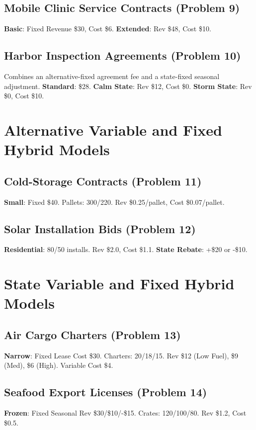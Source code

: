 	\subsection{Mobile Clinic Service Contracts (Problem 9)}
	\textbf{Basic}: Fixed Revenue \$30, Cost \$6. \textbf{Extended}: Rev \$48, Cost \$10.
	
	\subsection{Harbor Inspection Agreements (Problem 10)}
	Combines an alternative-fixed agreement fee and a state-fixed seasonal adjustment.
	\textbf{Standard}: \$28. \textbf{Calm State}: Rev \$12, Cost \$0. \textbf{Storm State}: Rev \$0, Cost \$10.
	
	\section{Alternative Variable and Fixed Hybrid Models}
	
	\subsection{Cold-Storage Contracts (Problem 11)}
	\textbf{Small}: Fixed \$40. Pallets: 300/220. Rev \$0.25/pallet, Cost \$0.07/pallet.
	
	\subsection{Solar Installation Bids (Problem 12)}
	\textbf{Residential}: 80/50 installs. Rev \$2.0, Cost \$1.1. \textbf{State Rebate}: +\$20 or -\$10.
	
	\section{State Variable and Fixed Hybrid Models}
	
	\subsection{Air Cargo Charters (Problem 13)}
	\textbf{Narrow}: Fixed Lease Cost \$30. Charters: 20/18/15. Rev \$12 (Low Fuel), \$9 (Med), \$6 (High). Variable Cost \$4.
	
	\subsection{Seafood Export Licenses (Problem 14)}
	\textbf{Frozen}: Fixed Seasonal Rev \$30/\$10/-\$15. Crates: 120/100/80. Rev \$1.2, Cost \$0.5.
	
